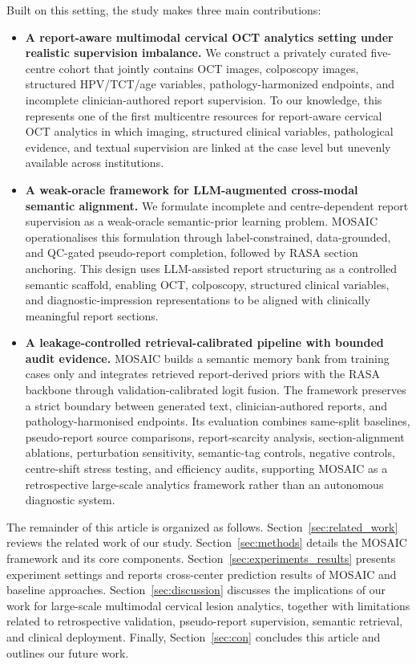 \documentclass[11pt, a4paper]{article}
\theoremstyle{plain}
\theoremstyle{definition}
\begin{document}
Built on this setting, the study makes three main contributions:
\begin{itemize}
\item \textbf{A report-aware multimodal cervical OCT analytics setting under realistic supervision imbalance.}
We construct a privately curated five-centre cohort that jointly contains OCT images, colposcopy images, structured HPV/TCT/age variables, pathology-harmonized endpoints, and incomplete clinician-authored report supervision. To our knowledge, this represents one of the first multicentre resources for report-aware cervical OCT analytics in which imaging, structured clinical variables, pathological evidence, and textual supervision are linked at the case level but unevenly available across institutions.

\item \textbf{A weak-oracle framework for LLM-augmented cross-modal semantic alignment.}
We formulate incomplete and centre-dependent report supervision as a weak-oracle semantic-prior learning problem. MOSAIC operationalises this formulation through label-constrained, data-grounded, and QC-gated pseudo-report completion, followed by RASA section anchoring. This design uses LLM-assisted report structuring as a controlled semantic scaffold, enabling OCT, colposcopy, structured clinical variables, and diagnostic-impression representations to be aligned with clinically meaningful report sections.

\item \textbf{A leakage-controlled retrieval-calibrated pipeline with bounded audit evidence.}
MOSAIC builds a semantic memory bank from training cases only and integrates retrieved report-derived priors with the RASA backbone through validation-calibrated logit fusion. The framework preserves a strict boundary between generated text, clinician-authored reports, and pathology-harmonised endpoints. Its evaluation combines same-split baselines, pseudo-report source comparisons, report-scarcity analysis, section-alignment ablations, perturbation sensitivity, semantic-tag controls, negative controls, centre-shift stress testing, and efficiency audits, supporting MOSAIC as a retrospective large-scale analytics framework rather than an autonomous diagnostic system.
\end{itemize}


The remainder of this article is organized as follows. Section~\ref{sec:related_work} reviews the related work of our study. Section~\ref{sec:methods} details the MOSAIC framework and its core components. Section~\ref{sec:experiments_results} presents experiment settings and reports cross-center prediction results of MOSAIC and baseline approaches. Section~\ref{sec:discussion} discusses the implications of our work for large-scale multimodal cervical lesion analytics, together with limitations related to retrospective validation, pseudo-report supervision, semantic retrieval, and clinical deployment. Finally, Section~\ref{sec:con} concludes this article and outlines our future work.
\end{document}
